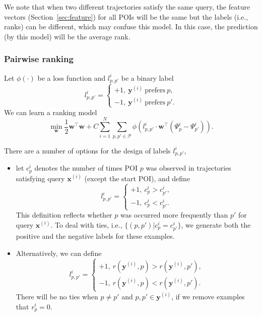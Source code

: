 We note that when two different trajectories satisfy the same query, the feature vectors (Section~\ref{sec:feature}) for all POIs will be the same 
but the labels (i.e., ranks) can be different, which may confuse this model. In this case, the prediction (by this model) will be the average rank.




\subsubsection{Pairwise ranking}
\label{sec:rank}

Let $\phi(\cdot)$ be a loss function and $l_{p,p'}^i$ be a binary label
\begin{equation*}
l_{p,p'}^i = \begin{cases}
+1,~ \mathbf{y}^{(i)} ~\text{prefers}~ p, \\
-1,~ \mathbf{y}^{(i)} ~\text{prefers}~ p'.
\end{cases}
\end{equation*}
We can learn a ranking model
\begin{equation*}
\min_{\mathbf{w}} \frac{1}{2} \mathbf{w}^\top \mathbf{w} +  
C \sum_{i=1}^N \sum_{p, p' \in \mathcal{P}} \phi \left( l_{p,p'}^i \cdot \mathbf{w}^\top (\Psi_p^i - \Psi_{p'}^i) \right).
\end{equation*}

There are a number of options for the design of labels $l_{p,p'}^i$,
\begin{itemize}
\item let $c_p^i$ denotes the number of times POI $p$ was observed in trajectories satisfying query $\mathbf{x}^{(i)}$ (except the start POI), and define
      \begin{equation*}
      l_{p,p'}^i = \begin{cases}
      +1,~ c_p^i > c_{p'}^i, \\
      -1,~ c_p^i < c_{p'}^i.
      \end{cases}
      \end{equation*}
      This definition reflects whether $p$ was occurred more frequently than $p'$ for query $\mathbf{x}^{(i)}$.
      To deal with ties, i.e., $\{(p, p') | c_p^i = c_{p'}^i\}$, we generate both the positive and the negative labels for these examples.
\item Alternatively, we can define
      \begin{equation*}
      l_{p,p'}^i = \begin{cases}
      +1,~ r(\mathbf{y}^{(i)}, p) > r(\mathbf{y}^{(i)}, p'), \\
      -1,~ r(\mathbf{y}^{(i)}, p) < r(\mathbf{y}^{(i)}, p').
      \end{cases}
      \end{equation*}
      There will be no ties when $p \ne p'$ and $p, p' \in \mathbf{y}^{(i)}$, if we remove examples that $r_p^i = 0$.
\end{itemize}


